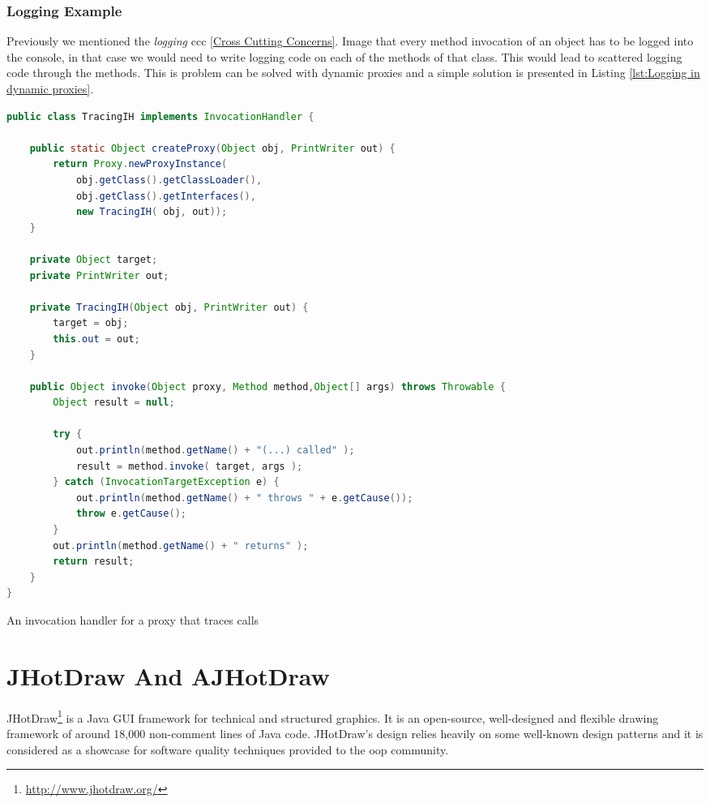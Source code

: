 \subsubsection{Logging Example}
Previously we mentioned the \textit{logging} \ac{ccc} \ref{Cross Cutting Concerns}.
Image that every method invocation of an object has to be logged into the console, in that case we would need to write logging code on each of the methods of that class.
This would lead to scattered logging code through the methods.
This is problem can be solved with dynamic proxies and a simple solution is presented in Listing \ref{lst:Logging in dynamic proxies}.

\begin{sourcecode}[H]
	\begin{lstlisting}[language=Java]
public class TracingIH implements InvocationHandler {
	
	public static Object createProxy(Object obj, PrintWriter out) {
		return Proxy.newProxyInstance(
			obj.getClass().getClassLoader(), 
			obj.getClass().getInterfaces(), 
			new TracingIH( obj, out));
	}

	private Object target;
	private PrintWriter out;

	private TracingIH(Object obj, PrintWriter out) {
		target = obj;
		this.out = out;
	}

	public Object invoke(Object proxy, Method method,Object[] args) throws Throwable {
		Object result = null;

		try {
			out.println(method.getName() + "(...) called" );
			result = method.invoke( target, args );
		} catch (InvocationTargetException e) {
			out.println(method.getName() + " throws " + e.getCause());
			throw e.getCause();
		}
		out.println(method.getName() + " returns" );
		return result;
	}
}
	\end{lstlisting}
	\caption{An invocation handler for a proxy that traces calls \cite{forman2004java}}
	\label{lst:Logging in dynamic proxies}
\end{sourcecode}

\section{JHotDraw And AJHotDraw}\label{JHotDraw And AJHotDraw}
JHotDraw\footnote{\url{http://www.jhotdraw.org/}} is a Java GUI framework for technical and structured graphics. 
It is an open-source, well-designed and flexible drawing framework of around 18,000 non-comment lines of Java code. 
JHotDraw's  design relies heavily on some well-known design patterns\cite{gamma1995design} and it is considered as a showcase for software quality techniques provided to the \ac{oop} community. 

